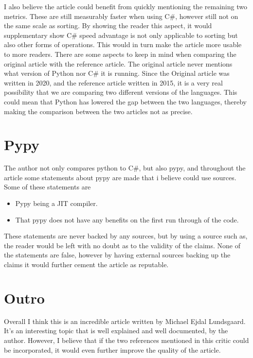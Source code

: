 \documentclass{article}
\begin{document}
I also believe the article could benefit from quickly mentioning the remaining two metrics. These are still measurably faster when using C\#, however still not on the same scale as sorting. By showing the reader this aspect, it would supplementary show C\# speed advantage is not only applicable to sorting but also other forms of operations. This would in turn make the article more usable to more readers. 
There are some aspects to keep in mind when comparing the original article with the reference article. The original article never mentions what version of Python nor C\# it is running. Since the Original article was written in 2020, and the reference article written in 2015, it is a very real possibility that we are comparing two different versions of the languages. This could mean that Python has lowered the gap between the two languages, thereby making the comparison between the two articles not as precise. 

\section*{Pypy}

The author not only compares python to C\#, but also pypy, and throughout the article some statements about pypy are made that i believe could use sources. Some of these statements are
\begin{itemize}
  \item Pypy being a JIT compiler.
  \item That pypy does not have any benefits on the first run through of the code.
\end{itemize}
These statements are never backed by any sources, but by using a source such as\cite{pypyRef}, the reader would be left with no doubt as to the validity of the claims. None of the statements are false, however by having external sources backing up the claims it would further cement the article as reputable.

\section*{Outro}
Overall I think this is an incredible article written by Michael Ejdal Lundsgaard. It's an interesting topic that is well explained and well documented, by the author. However, I believe that if the two references mentioned in this critic could be incorporated, it would even further improve the quality of the article.
\end{document}
